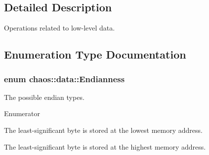 \subsection{Detailed Description}
Operations related to low-\/level data. 

\subsection{Enumeration Type Documentation}
\hypertarget{namespacechaos_1_1data_adb2657d50c0b84cdc1153001031bbf3f}{
\subsubsection[{Endianness}]{\setlength{\rightskip}{0pt plus 5cm}enum {\bf chaos\-::data\-::\-Endianness}}}\label{namespacechaos_1_1data_adb2657d50c0b84cdc1153001031bbf3f}


The possible endian types. 

\begin{Desc}
\item[Enumerator]\par
\begin{description}
\item[{\em 
\hypertarget{namespacechaos_1_1data_adb2657d50c0b84cdc1153001031bbf3fa7fc5455bb6147c278dfa4a84e255c66d}{E\-N\-D\-I\-A\-N\-\_\-\-L\-I\-T\-T\-L\-E}\label{namespacechaos_1_1data_adb2657d50c0b84cdc1153001031bbf3fa7fc5455bb6147c278dfa4a84e255c66d}
}]The least-\/significant byte is stored at the lowest memory address. \item[{\em 
\hypertarget{namespacechaos_1_1data_adb2657d50c0b84cdc1153001031bbf3fa0e1ed99b965cedefe24534be309738ad}{E\-N\-D\-I\-A\-N\-\_\-\-B\-I\-G}\label{namespacechaos_1_1data_adb2657d50c0b84cdc1153001031bbf3fa0e1ed99b965cedefe24534be309738ad}
}]The least-\/significant byte is stored at the highest memory address. \end{description}
\end{Desc}
